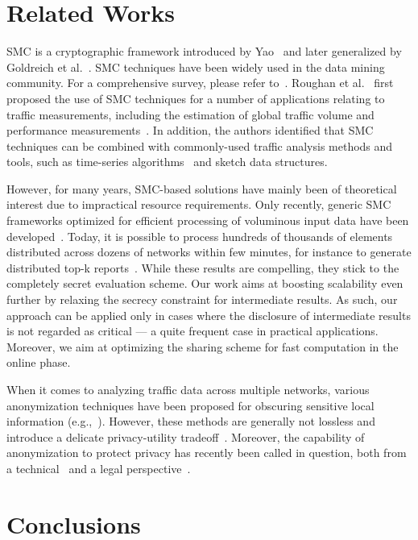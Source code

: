 \documentclass{sig-alternate}
\begin{document}
\section{Related Works}

SMC is a cryptographic framework introduced by Yao~\cite{yao1982psc} and later
generalized by Goldreich et al.~\cite{Goldreich1987any}. 
SMC techniques have been widely used in the data mining community. For a comprehensive survey, please
refer to~\cite{Aggarwal2008survey}.
Roughan et al.~\cite{RoughanCCR} first proposed the use of SMC techniques for a number of applications
relating to traffic measurements, including the estimation of
global traffic volume and performance measurements~\cite{roughan2006ppp}.
In addition, the authors identified that SMC techniques can
be combined with commonly-used traffic analysis methods and tools, 
such as time-series algorithms~\cite{Atallah04} and sketch data structures. 

However, for many years, SMC-based solutions have mainly been of theoretical interest due
to impractical resource requirements. Only recently, generic SMC frameworks optimized for
efficient processing of voluminous input data have been developed~\cite{sepia10, Sharemind}.
Today, it is possible to process hundreds of thousands of elements distributed across
dozens of networks within few minutes, for instance to generate distributed top-k reports~\cite{burkhart-topk}.
While these results are compelling, they stick to the completely secret evaluation scheme.
Our work aims at boosting scalability even further by relaxing the secrecy constraint for intermediate results.
As such, our approach can be applied only in cases where the disclosure of intermediate results is not regarded as critical --- a quite frequent case in practical applications.
Moreover, we aim 
at optimizing the sharing scheme for fast computation in the online phase.

When it comes to analyzing traffic data across multiple networks, various anonymization techniques have been
proposed for obscuring sensitive local information (e.g.,~\cite{Slagell2006Flaim}). However,
these methods are generally not lossless and introduce a delicate privacy-utility tradeoff~\cite{Pang2006tcpmkpub}.
Moreover, the capability of anonymization to protect privacy has recently been called in question, both from a technical~\cite{burkhart2010anonymization} 
and a legal perspective~\cite{Ohm2010}.

\section{Conclusions}
\end{document}
